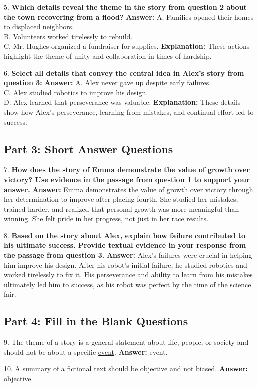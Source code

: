 \documentclass[12pt]{article}
\begin{document}
\vspace{1cm}
5. \textbf{Which details reveal the theme in the story from question 2 about the town recovering from a flood?}  
\textbf{Answer:} A. Families opened their homes to displaced neighbors. \\
B. Volunteers worked tirelessly to rebuild. \\
C. Mr. Hughes organized a fundraiser for supplies.  
\textbf{Explanation:} These actions highlight the theme of unity and collaboration in times of hardship.

\vspace{1cm}
6. \textbf{Select all details that convey the central idea in Alex’s story from question 3:}  
\textbf{Answer:} A. Alex never gave up despite early failures. \\
C. Alex studied robotics to improve his design. \\
D. Alex learned that perseverance was valuable.  
\textbf{Explanation:} These details show how Alex's perseverance, learning from mistakes, and continual effort led to success.

\subsection*{Part 3: Short Answer Questions}

7. \textbf{How does the story of Emma demonstrate the value of growth over victory? Use evidence in the passage from question 1 to support your answer.}  
\textbf{Answer:} Emma demonstrates the value of growth over victory through her determination to improve after placing fourth. She studied her mistakes, trained harder, and realized that personal growth was more meaningful than winning. She felt pride in her progress, not just in her race results.

\vspace{1cm}
8. \textbf{Based on the story about Alex, explain how failure contributed to his ultimate success. Provide textual evidence in your response from the passage from question 3.}  
\textbf{Answer:} Alex’s failures were crucial in helping him improve his design. After his robot’s initial failure, he studied robotics and worked tirelessly to fix it. His perseverance and ability to learn from his mistakes ultimately led him to success, as his robot was perfect by the time of the science fair.

\subsection*{Part 4: Fill in the Blank Questions}

9. The theme of a story is a general statement about life, people, or society and should not be about a specific \underline{event}.  
\textbf{Answer:} event.

10. A summary of a fictional text should be \underline{objective} and not biased.  
\textbf{Answer:} objective.
\end{document}
